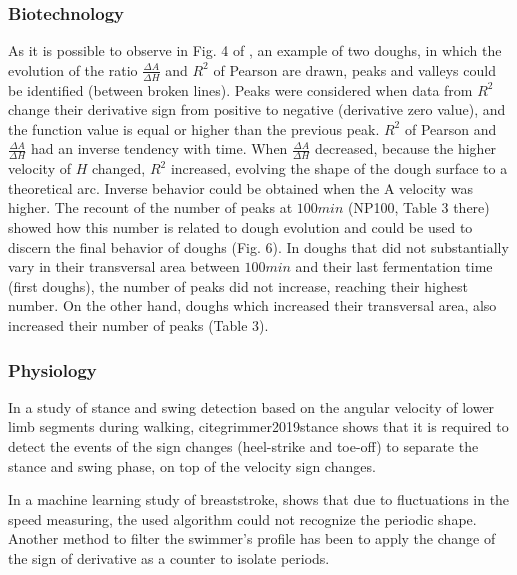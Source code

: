 \documentclass[11pt]{book}
\begin{document}

\subsubsection{Biotechnology}

As it is possible to observe in Fig. 4 of \cite{ivorra2014continuous},
an example of two doughs, in which the evolution of the ratio $\frac{\Delta A}{\Delta H}$
and $R^{2}$ of Pearson are drawn, peaks and valleys could be identified
(between broken lines). Peaks were considered when data from $R^{2}$
change their derivative sign from positive to negative (derivative
zero value), and the function value is equal or higher than the previous
peak. $R^{2}$ of Pearson and $\frac{\Delta A}{\Delta H}$ had an
inverse tendency with time. When $\frac{\Delta A}{\Delta H}$ decreased,
because the higher velocity of $H$ changed, $R^{2}$ increased, evolving
the shape of the dough surface to a theoretical arc. Inverse behavior
could be obtained when the A velocity was higher. The recount of the
number of peaks at $100min$ (NP100, Table 3 there) showed how this
number is related to dough evolution and could be used to discern
the final behavior of doughs (Fig. 6). In doughs that did not substantially
vary in their transversal area between $100min$ and their last fermentation
time (first doughs), the number of peaks did not increase, reaching
their highest number. On the other hand, doughs which increased their
transversal area, also increased their number of peaks (Table 3).


\subsubsection{Physiology}

In a study of stance and swing detection based on the angular velocity of lower
limb segments during walking, cite{grimmer2019stance} shows that it is required to detect the events of the sign changes (heel-strike
and toe-off) to separate the stance and swing phase, on top of the velocity sign changes.

In a machine learning study of breaststroke, \cite{zanchimachine} shows that due to fluctuations in the speed measuring, the used algorithm
could not recognize the periodic shape. Another method to filter the
swimmer's profile has been to apply the change of the sign of derivative
as a counter to isolate periods.
\end{document}
